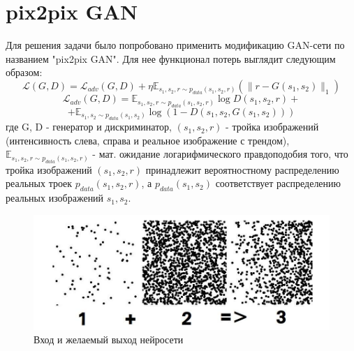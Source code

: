 \documentclass[a4paper]{article}
\begin{document}
	\section{pix2pix GAN}
		Для решения задачи было попробовано применить модификацию GAN-сети по названием "pix2pix GAN". Для нее функционал потерь выглядит следующим образом: $$ \mathcal{L}(G, D) = \mathcal{L}_{adv}(G, D) + \eta \mathbb{E}_{s_1, s_2, r \sim p_{data}(s_1, s_2, r)} (\parallel r - G(s_1, s_2) \parallel_1)$$
		$$ \mathcal{L}_{adv}(G, D) = \mathbb{E}_{s_1, s_2, r \sim p_{data}(s_1, s_2, r)}\log D(s_1, s_2, r) + $$ $$ + \mathbb{E}_{s_1, s_2 \sim p_{data}(s_1, s_2)} \log (1 - D(s_1, s_2, G(s_1, s_2)))$$
		где G, D - генератор и дискриминатор, $(s_1, s_2, r)$ - тройка изображений (интенсивность слева, справа и реальное изображение с трендом),  $\mathbb{E}_{s_1, s_2, r \sim p_{data}(s_1, s_2, r)}$ - мат. ожидание логарифмического правдоподобия того, что тройка изображений $(s_1, s_2, r)$ принадлежит вероятностному распределению реальных троек $p_{data}(s_1, s_2, r)$, а $p_{data}(s_1, s_2)$ соответствует распределению реальных изображений $s_1, s_2$.
		\begin{figure}[h]
			\begin{center}
				\includegraphics[width=0.75\linewidth]{p2p-gen}
			\end{center}
			\caption{Вход и желаемый выход нейросети}
		\end{figure}
\end{document}
